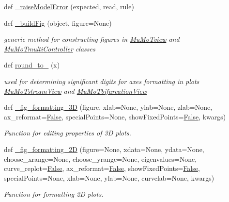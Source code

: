 \begin{DoxyCompactItemize}
def \hyperlink{namespace_mu_mo_t_1_1_mu_mo_t_a63a6213e268cff48055b330d7dd9e272}{\+\_\+raise\+Model\+Error} (expected, read, rule)
\item 
def \hyperlink{namespace_mu_mo_t_1_1_mu_mo_t_aada27c31be7a76cff44cfae711dcfec1}{\+\_\+build\+Fig} (object, figure=None)
\begin{DoxyCompactList}\small\item\em generic method for constructing figures in \hyperlink{class_mu_mo_t_1_1_mu_mo_t_1_1_mu_mo_tview}{Mu\+Mo\+Tview} and \hyperlink{class_mu_mo_t_1_1_mu_mo_t_1_1_mu_mo_tmulti_controller}{Mu\+Mo\+Tmulti\+Controller} classes \end{DoxyCompactList}\item 
def \hyperlink{namespace_mu_mo_t_1_1_mu_mo_t_a846433b0fc666c4874249f87f1dcc26f}{round\+\_\+to\+\_} (x)
\begin{DoxyCompactList}\small\item\em used for determining significant digits for axes formatting in plots \hyperlink{class_mu_mo_t_1_1_mu_mo_t_1_1_mu_mo_tstream_view}{Mu\+Mo\+Tstream\+View} and \hyperlink{class_mu_mo_t_1_1_mu_mo_t_1_1_mu_mo_tbifurcation_view}{Mu\+Mo\+Tbifurcation\+View} \end{DoxyCompactList}\item 
def \hyperlink{namespace_mu_mo_t_1_1_mu_mo_t_a2748e3bdfa70e8269681135256afc7b5}{\+\_\+fig\+\_\+formatting\+\_\+3D} (figure, xlab=None, ylab=None, zlab=None, ax\+\_\+reformat=\hyperlink{namespace_mu_mo_t_1_1_mu_mo_t_a36cde68b055f3f2ee671020af4ccf4e2}{False}, special\+Points=None, show\+Fixed\+Points=\hyperlink{namespace_mu_mo_t_1_1_mu_mo_t_a36cde68b055f3f2ee671020af4ccf4e2}{False}, kwargs)
\begin{DoxyCompactList}\small\item\em Function for editing properties of 3D plots. \end{DoxyCompactList}\item 
def \hyperlink{namespace_mu_mo_t_1_1_mu_mo_t_a60305dc657e88574bde40c257cc93399}{\+\_\+fig\+\_\+formatting\+\_\+2D} (figure=None, xdata=None, ydata=None, choose\+\_\+xrange=None, choose\+\_\+yrange=None, eigenvalues=None, curve\+\_\+replot=\hyperlink{namespace_mu_mo_t_1_1_mu_mo_t_a36cde68b055f3f2ee671020af4ccf4e2}{False}, ax\+\_\+reformat=\hyperlink{namespace_mu_mo_t_1_1_mu_mo_t_a36cde68b055f3f2ee671020af4ccf4e2}{False}, show\+Fixed\+Points=\hyperlink{namespace_mu_mo_t_1_1_mu_mo_t_a36cde68b055f3f2ee671020af4ccf4e2}{False}, special\+Points=None, xlab=None, ylab=None, curvelab=None, kwargs)
\begin{DoxyCompactList}\small\item\em Function for formatting 2D plots. \end{DoxyCompactList}\item 

\end{DoxyCompactItemize}
